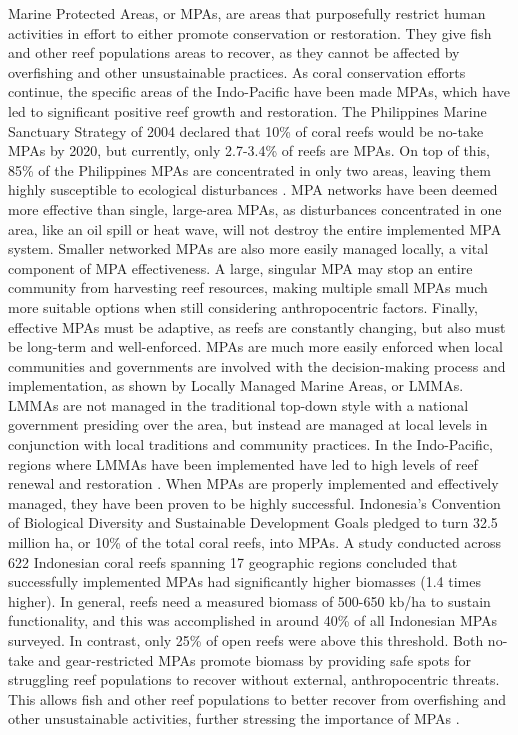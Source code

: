 \documentclass{book}\usepackage{knitr}
\begin{document}
{Marine Protected Areas, or MPAs, are areas that purposefully restrict human activities in effort to either promote conservation or restoration. They give fish and other reef populations areas to recover, as they cannot be affected by overfishing and other unsustainable practices. As coral conservation efforts continue, the specific areas of the Indo-Pacific have been made MPAs, which have led to significant positive reef growth and restoration. The Philippines Marine Sanctuary Strategy of 2004 declared that 10\% of coral reefs would be no-take MPAs by 2020, but currently, only 2.7-3.4\% of reefs are MPAs. On top of this, 85\% of the Philippines MPAs are concentrated in only two areas, leaving them highly susceptible to ecological disturbances \citep{10.2307/40603378}. MPA networks have been deemed more effective than single, large-area MPAs, as disturbances concentrated in one area, like an oil spill or heat wave, will not destroy the entire implemented MPA system. Smaller networked MPAs are also more easily managed locally, a vital component of MPA effectiveness. A large, singular MPA may stop an entire community from harvesting reef resources, making multiple small MPAs much more suitable options when still considering anthropocentric factors\citep{Keller2009ClimateCC}. Finally, effective MPAs must be adaptive, as reefs are constantly changing, but also must be long-term and well-enforced. MPAs are much more easily enforced when local communities and governments are involved with the decision-making process and implementation, as shown by Locally Managed Marine Areas, or LMMAs. LMMAs are not managed in the traditional top-down style with a national government presiding over the area, but instead are managed at local levels in conjunction with local traditions and community practices. In the Indo-Pacific, regions where LMMAs have been implemented have led to high levels of reef renewal and restoration \citep{cgarden}. 
When MPAs are properly implemented and effectively managed, they have been proven to be highly successful. Indonesia’s Convention of Biological Diversity and Sustainable Development Goals pledged to turn 32.5 million ha, or 10\% of the total coral reefs, into MPAs. A study conducted across 622 Indonesian coral reefs spanning 17 geographic regions concluded that successfully implemented MPAs had significantly higher biomasses (1.4 times higher). In general, reefs need a measured biomass of 500-650 kb/ha to sustain functionality, and this was accomplished in around 40\% of all Indonesian MPAs surveyed. In contrast, only 25\% of open reefs were above this threshold. Both no-take and gear-restricted MPAs promote biomass by providing safe spots for struggling reef populations to recover without external, anthropocentric threats. This allows fish and other reef populations to better recover from overfishing and other unsustainable activities, further stressing the importance of MPAs \citep{https://doi.org/10.1111/conl.12698}. 

}
\end{document}
